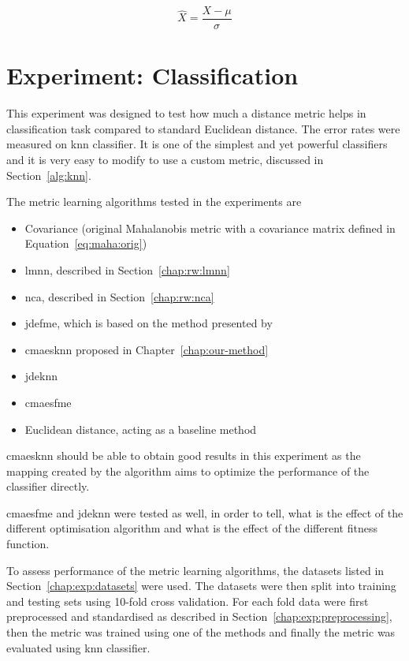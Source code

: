\documentclass[12pt,a4paper]{report}
\begin{document}
\begin{equation} \label{eq:stand}
\hat{X} = \frac{X-\mu}{\sigma}
\end{equation}

\section{Experiment: Classification} \label{chap:exp:classification}

This experiment was designed to test how much a distance metric helps in classification task compared to standard Euclidean distance. The error rates were measured on \ac{knn} classifier. It is one of the simplest and yet powerful classifiers and it is very easy to modify to use a custom metric, discussed in Section~\ref{alg:knn}.

The metric learning algorithms tested in the experiments are 

\begin{itemize}
\item Covariance (original Mahalanobis metric with a covariance matrix defined in Equation~\ref{eq:maha:orig})
\item \ac{lmnn}, described in Section~\ref{chap:rw:lmnn}
\item \ac{nca}, described in Section~\ref{chap:rw:nca}
\item \ac{jdefme}, which is based on the method presented by~\citep{fukui2013evolutionary}

\item \ac{cmaesknn} proposed in Chapter~\ref{chap:our-method}

\item \acf{jdeknn}
\item \acf{cmaesfme}

\item Euclidean distance, acting as a baseline method
\end{itemize}

\ac{cmaesknn} should be able to obtain good results in this experiment as the mapping created by the algorithm aims to optimize the performance of the classifier directly.

\ac{cmaesfme} and \ac{jdeknn} were tested as well, in order to tell, what is the effect of the different optimisation algorithm and what is the effect of the different fitness function.

To assess performance of the metric learning algorithms, the datasets listed in Section~\ref{chap:exp:datasets} were used. The datasets were then split into training and testing sets using 10-fold cross validation. For each fold data were first preprocessed and standardised as described in Section~\ref{chap:exp:preprocessing}, then the metric was trained using one of the methods and finally the metric was evaluated using \ac{knn} classifier.
\end{document}
